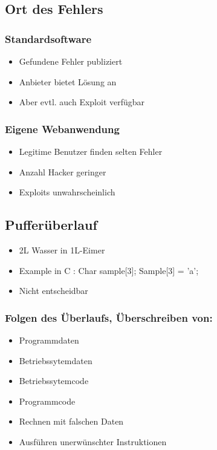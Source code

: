 \subsection*{ Ort des Fehlers}
\subsubsection*{Standardsoftware}
\begin{itemize}
	\item Gefundene Fehler publiziert
	\item Anbieter bietet Lösung an
	\item Aber evtl. auch Exploit verfügbar
\end{itemize}
\subsubsection*{Eigene Webanwendung}
\begin{itemize}
	\item Legitime Benutzer finden selten Fehler
	\item Anzahl Hacker geringer
	\item Exploits unwahrscheinlich
\end{itemize}


\subsection*{ Pufferüberlauf}
\begin{itemize}
	\item 2L Wasser in 1L-Eimer
	\item Example in C : 	Char sample[3]; Sample[3] = 'a';
	\item Nicht entscheidbar
\end{itemize}
\subsubsection*{Folgen des Überlaufs, Überschreiben von:}
\begin{itemize}
	\item Programmdaten
	\item Betriebssytemdaten
	\item Betriebssytemcode
	\item Programmcode
	\item Rechnen mit falschen Daten
	\item Ausführen unerwünschter Instruktionen
\end{itemize}

